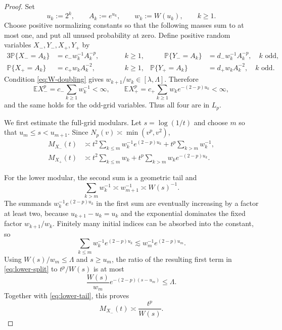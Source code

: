 \documentclass[11pt]{article}
\theoremstyle{definition}
\theoremstyle{remark}
\newcommand{\E}{\mathbb E}
\newcommand{\Pp}{\mathbb P}
\newcommand{\asympc}{\mathrel{\asymp}}
\newcommand{\lesssimc}{\mathrel{\lesssim}}
\begin{document}
\begin{proof}
Set
\[
  u_k:=2^k,\qquad A_k:=e^{u_k},\qquad w_k:=W(u_k),\qquad k\geq1.
\]
Choose positive normalizing constants so that the following masses sum to at
most one, and put all unused probability at zero.  Define positive random
variables $X_-,Y_-,X_+,Y_+$ by
\begin{alignat}{3}
  \Pp\{X_-=A_k\}&=c_-w_k^{-1}A_k^{-p},&\qquad& k\geq1,
  &\qquad \Pp\{Y_-=A_k\}&=d_-w_k^{-1}A_k^{-p},\quad k\text{ odd},
  \label{eq:lower-masses}\\
  \Pp\{X_+=A_k\}&=c_+w_kA_k^{-2},&& k\geq1,
  &\Pp\{Y_+=A_k\}&=d_+w_kA_k^{-2},\quad k\text{ odd}.
  \label{eq:upper-masses}
\end{alignat}
Condition \eqref{eq:W-doubling} gives $w_{k+1}/w_k\in[\lambda,\Lambda]$.
Therefore
\[
  \E X_-^p=c_-\sum_{k\geq1}w_k^{-1}<\infty,
  \qquad
  \E X_+^p=c_+\sum_{k\geq1}w_ke^{-(2-p)u_k}<\infty,
\]
and the same holds for the odd-grid variables.  Thus all four are in $L_p$.

We first estimate the full-grid modulars.  Let $s=\log(1/t)$ and choose $m$
so that $u_m\leq s<u_{m+1}$.  Since $N_p(v)\asymp\min(v^p,v^2)$,
\begin{align}
  M_{X_-}(t)
  &\asympc
  t^2\sum_{k\leq m}w_k^{-1}e^{(2-p)u_k}
  +t^p\sum_{k>m}w_k^{-1},\label{eq:lower-split}\\
  M_{X_+}(t)
  &\asympc
  t^2\sum_{k\leq m}w_k
  +t^p\sum_{k>m}w_ke^{-(2-p)u_k}.
  \label{eq:upper-split}
\end{align}

For the lower modular, the second sum is a geometric tail and
\begin{equation}\label{eq:lower-tail}
  \sum_{k>m}w_k^{-1}\asympc w_{m+1}^{-1}\asympc W(s)^{-1}.
\end{equation}
The summands $w_k^{-1}e^{(2-p)u_k}$ in the first sum are eventually increasing
by a factor at least two, because $u_{k+1}-u_k=u_k$ and the exponential
dominates the fixed factor $w_{k+1}/w_k$.  Finitely many initial indices can
be absorbed into the constant, so
\[
  \sum_{k\leq m}w_k^{-1}e^{(2-p)u_k}\lesssimc
  w_m^{-1}e^{(2-p)u_m}.
\]
Using $W(s)/w_m\leq\Lambda$ and $s\geq u_m$, the ratio of the resulting first
term in \eqref{eq:lower-split} to $t^p/W(s)$ is at most
\[
  \frac{W(s)}{w_m}e^{-(2-p)(s-u_m)}\leq\Lambda.
\]
Together with \eqref{eq:lower-tail}, this proves
\begin{equation}\label{eq:lower-result}
  M_{X_-}(t)\asympc \frac{t^p}{W(s)}.
\end{equation}


\end{proof}
\end{document}
